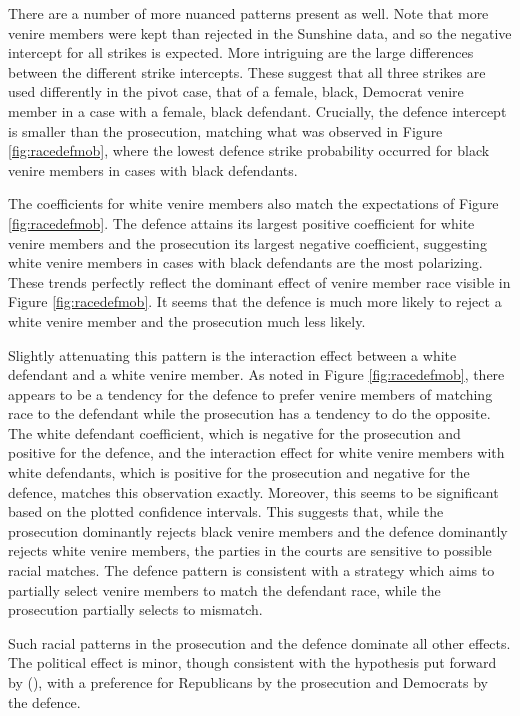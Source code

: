 \documentclass[12pt]{article}
\begin{document}
There are a number of more nuanced patterns present as well. Note that more venire members were kept than rejected in the Sunshine data, and so the negative intercept for all strikes is expected. More intriguing are the large differences between the different strike intercepts. These suggest that all three strikes are used differently in the pivot case, that of a female, black, Democrat venire member in a case with a female, black defendant. Crucially, the defence intercept is smaller than the prosecution, matching what was observed in Figure \ref{fig:racedefmob}, where the lowest defence strike probability occurred for black venire members in cases with black defendants. 

The coefficients for white venire members also match the expectations of Figure \ref{fig:racedefmob}. The defence attains its largest positive coefficient for white venire members and the prosecution its largest negative coefficient, suggesting white venire members in cases with black defendants are the most polarizing. These trends perfectly reflect the dominant effect of venire member race visible in Figure \ref{fig:racedefmob}. It seems that the defence is much more likely to reject a white venire member and the prosecution much less likely.

Slightly attenuating this pattern is the interaction effect between a white defendant and a white venire member. As noted in Figure \ref{fig:racedefmob}, there appears to be a tendency for the defence to prefer venire members of matching race to the defendant while the prosecution has a tendency to do the opposite. The white defendant coefficient, which is negative for the prosecution and positive for the defence, and the interaction effect for white venire members with white defendants, which is positive for the prosecution and negative for the defence, matches this observation exactly. Moreover, this seems to be significant based on the plotted confidence intervals. This suggests that, while the prosecution dominantly rejects black venire members and the defence dominantly rejects white venire members, the parties in the courts are sensitive to possible racial matches. The defence pattern is consistent with a strategy which aims to partially select venire members to match the defendant race, while the prosecution partially selects to mismatch.

Such racial patterns in the prosecution and the defence dominate all other effects. The political effect is minor, though consistent with the hypothesis put forward by (\cite{revesz2016}), with a preference for Republicans by the prosecution and Democrats by the defence.
\end{document}
